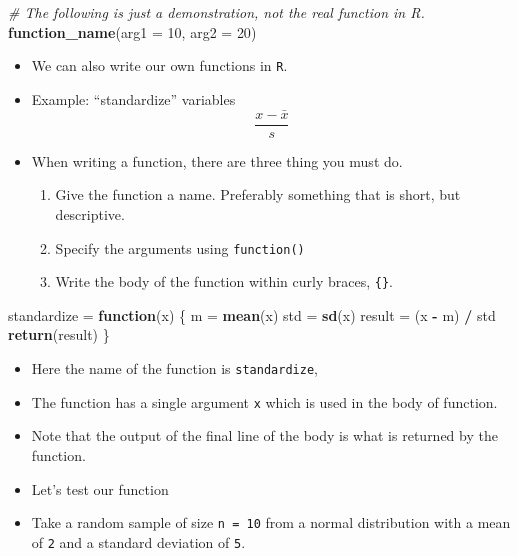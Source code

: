 \documentclass[]{book}
\newenvironment{Shaded}{\begin{snugshade}}{\end{snugshade}}
\newcommand{\KeywordTok}[1]{\textcolor[rgb]{0.13,0.29,0.53}{\textbf{#1}}}
\newcommand{\DataTypeTok}[1]{\textcolor[rgb]{0.13,0.29,0.53}{#1}}
\newcommand{\DecValTok}[1]{\textcolor[rgb]{0.00,0.00,0.81}{#1}}
\newcommand{\StringTok}[1]{\textcolor[rgb]{0.31,0.60,0.02}{#1}}
\newcommand{\CommentTok}[1]{\textcolor[rgb]{0.56,0.35,0.01}{\textit{#1}}}
\newcommand{\ControlFlowTok}[1]{\textcolor[rgb]{0.13,0.29,0.53}{\textbf{#1}}}
\newcommand{\OperatorTok}[1]{\textcolor[rgb]{0.81,0.36,0.00}{\textbf{#1}}}
\newcommand{\NormalTok}[1]{#1}
\providecommand{\tightlist}{%
  \setlength{\itemsep}{0pt}\setlength{\parskip}{0pt}}
\begin{document}
\begin{Shaded}
\begin{Highlighting}[]
\CommentTok{# The following is just a demonstration, not the real function in R.}
\KeywordTok{function_name}\NormalTok{(}\DataTypeTok{arg1 =} \DecValTok{10}\NormalTok{, }\DataTypeTok{arg2 =} \DecValTok{20}\NormalTok{)}
\end{Highlighting}
\end{Shaded}

\begin{itemize}
\item
  We can also write our own functions in \texttt{R}.
\item
  Example: ``standardize'' variables \[
  \frac{x - \bar{x}}{s}
  \]
\item
  When writing a function, there are three thing you must do.

  \begin{enumerate}
  \def\labelenumi{\arabic{enumi}.}
  \tightlist
  \item
    Give the function a name. Preferably something that is short, but
    descriptive.
  \item
    Specify the arguments using \texttt{function()}
  \item
    Write the body of the function within curly braces, \texttt{\{\}}.
  \end{enumerate}
\end{itemize}

\begin{Shaded}
\begin{Highlighting}[]
\NormalTok{standardize =}\StringTok{ }\ControlFlowTok{function}\NormalTok{(x) \{}
\NormalTok{  m =}\StringTok{ }\KeywordTok{mean}\NormalTok{(x)}
\NormalTok{  std =}\StringTok{ }\KeywordTok{sd}\NormalTok{(x)}
\NormalTok{  result =}\StringTok{ }\NormalTok{(x }\OperatorTok{-}\StringTok{ }\NormalTok{m) }\OperatorTok{/}\StringTok{ }\NormalTok{std}
  \KeywordTok{return}\NormalTok{(result)}
\NormalTok{\}}
\end{Highlighting}
\end{Shaded}

\begin{itemize}
\item
  Here the name of the function is \texttt{standardize},
\item
  The function has a single argument \texttt{x} which is used in the
  body of function.
\item
  Note that the output of the final line of the body is what is returned
  by the function.
\item
  Let's test our function
\item
  Take a random sample of size \texttt{n\ =\ 10} from a normal
  distribution with a mean of \texttt{2} and a standard deviation of
  \texttt{5}.
\end{itemize}
\end{document}
